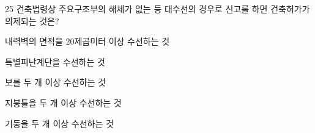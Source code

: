 \begin{question}{25}
건축법령상 주요구조부의 해체가 없는 등 대수선의 경우로 신고를 하면 건축허가가 의제되는 것은?
\begin{choices}
  \item 내력벽의 면적을 20제곱미터 이상 수선하는 것
  \item 특별피난계단을 수선하는 것
  \item 보를 두 개 이상 수선하는 것
  \item 지붕틀을 두 개 이상 수선하는 것
  \item 기둥을 두 개 이상 수선하는 것
\end{choices}
\end{question}
